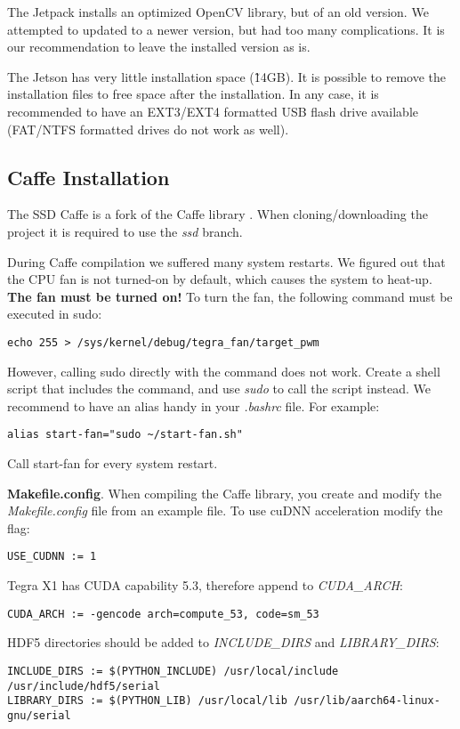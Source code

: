The Jetpack installs an optimized OpenCV library, but of an old version. We attempted to updated to a newer version, but had too many complications. It is our recommendation to leave the installed version as is.

The Jetson has very little installation space (\~14GB). It is possible to remove the installation files to free space after the installation. In any case, it is recommended to have an EXT3/EXT4 formatted USB flash drive available (FAT/NTFS formatted drives do not work as well). 

\subsection{Caffe Installation}

The SSD Caffe \cite{caffessd} is a fork of the Caffe library \cite{caffeoriginal}. When cloning/downloading the project it is required to use the \textit{ssd} branch.

During Caffe compilation we suffered many system restarts. We figured out that the CPU fan is not turned-on by default, which causes the system to heat-up. \textbf{The fan must be turned on!} To turn the fan, the following command must be executed in sudo:
\begin{lstlisting} 
echo 255 > /sys/kernel/debug/tegra_fan/target_pwm
\end{lstlisting}
However, calling sudo directly with the command does not work. Create a shell script that includes the command, and use \textit{sudo} to call the script instead. We recommend to have an alias handy in your \textit{.bashrc} file. For example:
\begin{lstlisting} 
alias start-fan="sudo ~/start-fan.sh"
\end{lstlisting}
Call start-fan for every system restart.

\textbf{Makefile.config}. 
When compiling the Caffe library, you create and modify the \textit{Makefile.config} file from an example file.
To use cuDNN acceleration modify the flag:
\begin{lstlisting} 
USE_CUDNN := 1
\end{lstlisting}

Tegra X1 has CUDA capability 5.3, therefore append to \textit{CUDA\_ARCH}: 
\begin{lstlisting} 
CUDA_ARCH := -gencode arch=compute_53, code=sm_53
\end{lstlisting}

HDF5 directories should be added to \textit{INCLUDE\_DIRS} and \textit{LIBRARY\_DIRS}:
\begin{lstlisting} 
INCLUDE_DIRS := $(PYTHON_INCLUDE) /usr/local/include /usr/include/hdf5/serial
LIBRARY_DIRS := $(PYTHON_LIB) /usr/local/lib /usr/lib/aarch64-linux-gnu/serial
\end{lstlisting}

